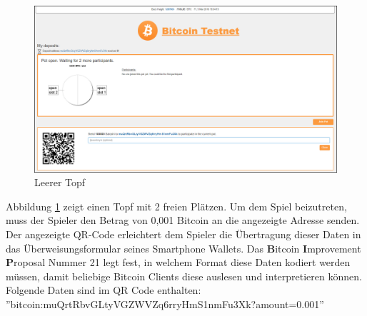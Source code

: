 \begin{figure}[H]
\centering
\includegraphics[width=1\linewidth]{Figures/btc_gui/pot_open_empty}
\decoRule
\caption{Leerer Topf}
\label{fig:pot_open_empty}
\end{figure}
Abbildung \ref{fig:pot_open_empty} zeigt einen Topf mit 2 freien Plätzen. Um dem Spiel beizutreten, muss der Spieler den Betrag von 0,001 Bitcoin an die angezeigte Adresse senden. Der angezeigte QR-Code erleichtert dem Spieler die Übertragung dieser Daten in das Überweisungsformular seines Smartphone Wallets. Das \textbf{B}itcoin \textbf{I}mprovement \textbf{P}roposal Nummer 21 \cite{bip21} legt fest, in welchem Format diese Daten kodiert werden müssen, damit beliebige Bitcoin Clients diese auslesen und interpretieren können. 
Folgende Daten sind im QR Code enthalten:\\ ''bitcoin:muQrtRbvGLtyVGZWVZq6rryHmS1nmFu3Xk?amount=0.001''


